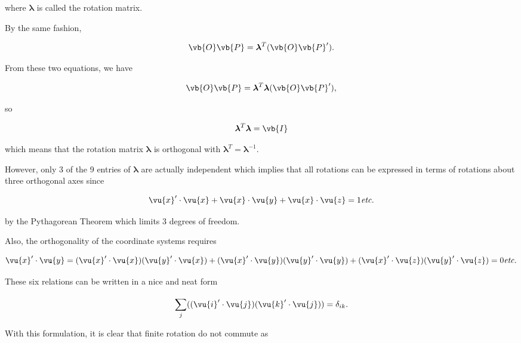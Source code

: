 \documentclass[a4paper,12pt]{report}
\begin{document}
where \(\boldsymbol{\lambda } \) is called the rotation matrix. 

By the same fashion, 

\begin{equation}
	\vb{O} \vb{P}  = \boldsymbol{\lambda } ^{T} (\vb{O} \vb{P}  ').
\end{equation}

From these two equations, we have 

\begin{equation}
	\vb{O} \vb{P}  = \boldsymbol{\lambda } ^{T} \boldsymbol{\lambda } (\vb{O} \vb{P} '), 
\end{equation}

so

\begin{equation}
	\boldsymbol{\lambda } ^{T} \boldsymbol{\lambda } = \vb{I} 
\end{equation}

which means that the rotation matrix \(\boldsymbol{\lambda } \) is orthogonal with \(\boldsymbol{\lambda } ^{T} = \boldsymbol{\lambda } ^{-1} \).  

However, only 3 of the 9 entries of \(\boldsymbol{\lambda } \) are actually independent which implies that all rotations can be expressed in terms of rotations about three orthogonal axes since 

\begin{equation}
	\vu{x} ' \cdot \vu{x} + \vu{x}  \cdot \vu{y} + \vu{x}  \cdot \vu{z} = 1 \textit{etc.} 
\end{equation}

by the Pythagorean Theorem which limits 3 degrees of freedom. 

Also, the orthogonality of the coordinate systems requires

\begin{equation}
	\vu{x} ' \cdot \vu{y} = (\vu{x} ' \cdot \vu{x} )(\vu{y} '\cdot \vu{x} ) + (\vu{x} ' \cdot \vu{y} )(\vu{y} '\cdot \vu{y} ) + (\vu{x} '\cdot \vu{z} )(\vu{y} '\cdot \vu{z} ) = 0 \textit{etc.}
\end{equation}

These six relations can be written in a nice and neat form

\begin{equation}
	\sum_{j}^{} ((\vu{i} '\cdot \vu{j})(\vu{k} '\cdot \vu{j} )) = \delta _{ik} . 
\end{equation}

With this formulation, it is clear that finite rotation do not commute as
\end{document}
